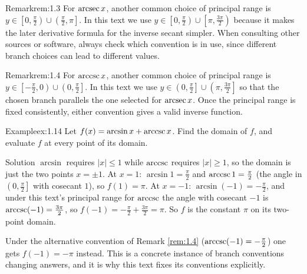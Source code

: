 \documentclass[a4paper,12pt,oneside]{memoir}
\begin{document}
\begin{envremark}{Remark}{rem:1.3}{}
For \(\operatorname{arcsec} x\), another common choice of principal range is \(y \in \left[0, \tfrac{\pi}{2}\right) \cup \left(\tfrac{\pi}{2}, \pi\right]\). In this text we use \(y \in \left[0, \tfrac{\pi}{2}\right) \cup \left[\pi, \tfrac{3\pi}{2}\right)\) because it makes the later derivative formula for the inverse secant simpler. When consulting other sources or software, always check which convention is in use, since different branch choices can lead to different values.
\end{envremark}
\begin{envremark}{Remark}{rem:1.4}{}
For \(\operatorname{arccsc} x\), another common choice of principal range is \(y \in \left[-\tfrac{\pi}{2}, 0\right) \cup \left(0, \tfrac{\pi}{2}\right]\). In this text we use \(y \in \left(0, \tfrac{\pi}{2}\right] \cup \left(\pi, \tfrac{3\pi}{2}\right]\) so that the chosen branch parallels the one selected for \(\operatorname{arcsec} x\). Once the principal range is fixed consistently, either convention gives a valid inverse function.
\end{envremark}
\begin{workedexample}
\begin{envexample}{Example}{ex:1.14}{}
Let \(f(x) = \arcsin x + \operatorname{arccsc} x\). Find the domain of \(f\), and evaluate \(f\) at every point of its domain.
\end{envexample}
\begin{envsolution}{Solution}{}{}
\(\arcsin\) requires \(|x| \le 1\) while \(\operatorname{arccsc}\) requires \(|x| \ge 1\), so the domain is just the two points \(x = \pm 1\). At \(x = 1\): \(\arcsin 1 = \tfrac{\pi}{2}\) and \(\operatorname{arccsc} 1 = \tfrac{\pi}{2}\) (the angle in \(\left(0, \tfrac{\pi}{2}\right]\) with cosecant \(1\)), so \(f(1) = \pi\). At \(x = -1\): \(\arcsin(-1) = -\tfrac{\pi}{2}\), and under this text’s principal range for \(\operatorname{arccsc}\) the angle with cosecant \(-1\) is \(\operatorname{arccsc}(-1) = \tfrac{3\pi}{2}\), so \(f(-1) = -\tfrac{\pi}{2} + \tfrac{3\pi}{2} = \pi\). So \(f\) is the constant \(\pi\) on its two-point domain.

Under the alternative convention of Remark \ref{rem:1.4} (\(\operatorname{arccsc}(-1) = -\tfrac{\pi}{2}\)) one gets \(f(-1) = -\pi\) instead. This is a concrete instance of branch conventions changing answers, and it is why this text fixes its conventions explicitly.
\end{envsolution}
\end{workedexample}
\end{document}
